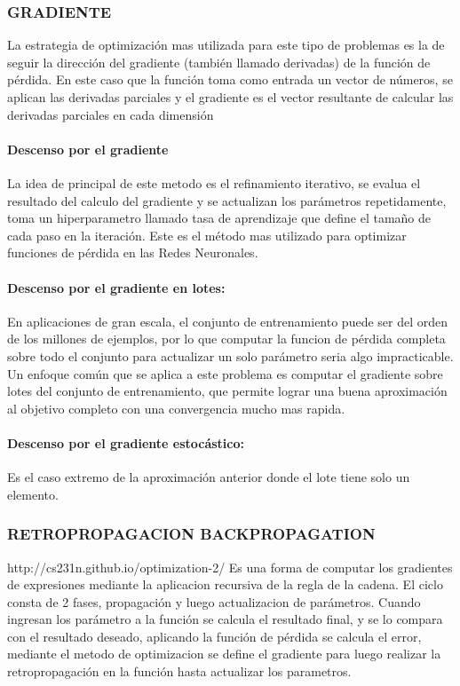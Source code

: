 \documentclass[a4paper,10pt]{article}
\begin{document}
\subsubsection{GRADIENTE} 
La estrategia de optimización mas utilizada para este tipo de problemas es la de seguir la dirección del gradiente (también llamado derivadas) de la función de pérdida.
En este caso que la función toma como entrada un vector de números, se aplican las derivadas parciales y el gradiente es el vector resultante de calcular las derivadas parciales
en cada dimensión

\paragraph{Descenso por el gradiente}
La idea de principal de este metodo es el refinamiento iterativo, se evalua el resultado del calculo del gradiente y se actualizan los parámetros repetidamente, 
toma un hiperparametro llamado tasa de aprendizaje que define el tamaño de cada paso en la iteración.
Este es el método mas utilizado para optimizar funciones de pérdida en las Redes Neuronales. 

\paragraph{Descenso por el gradiente en lotes:} 
En aplicaciones de gran escala, el conjunto de entrenamiento puede ser del orden de los millones de ejemplos, por lo que computar la funcion de 
pérdida completa sobre todo el conjunto para actualizar un solo parámetro seria algo impracticable.
Un enfoque común que se aplica a este problema es computar el gradiente sobre lotes del conjunto de entrenamiento, que permite lograr una buena aproximación al objetivo completo con
una convergencia mucho mas rapida.

\paragraph{Descenso por el gradiente estocástico:} 
Es el caso extremo de la aproximación anterior donde el lote tiene solo un elemento.

\subsubsection{RETROPROPAGACION BACKPROPAGATION}
http://cs231n.github.io/optimization-2/
Es una forma  de computar los gradientes de expresiones mediante la aplicacion recursiva de la regla de la cadena.
El ciclo consta de 2 fases, propagación y luego actualizacion de parámetros. Cuando ingresan los parámetro a la función se calcula el resultado final, y se lo compara con el resultado 
deseado, aplicando la función de pérdida se calcula el error, mediante el metodo de optimizacion se define el gradiente para luego realizar la retropropagación en la función hasta 
actualizar los parametros.
\end{document}
